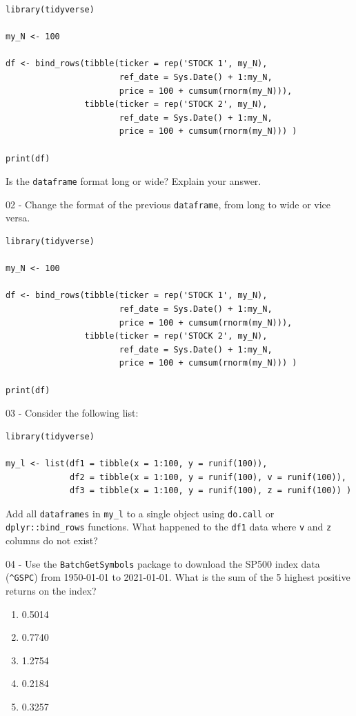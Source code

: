 \documentclass[
  12pt,
]{book}
\providecommand{\tightlist}{%
  \setlength{\itemsep}{0pt}\setlength{\parskip}{0pt}}
\begin{document}
\begin{verbatim}
library(tidyverse)

my_N <- 100

df <- bind_rows(tibble(ticker = rep('STOCK 1', my_N),
                       ref_date = Sys.Date() + 1:my_N,
                       price = 100 + cumsum(rnorm(my_N))),
                tibble(ticker = rep('STOCK 2', my_N),
                       ref_date = Sys.Date() + 1:my_N,
                       price = 100 + cumsum(rnorm(my_N))) )

print(df)
\end{verbatim}

Is the \texttt{dataframe} format long or wide? Explain your answer.

02 -
Change the format of the previous \texttt{dataframe}, from long to wide or vice versa.

\begin{verbatim}
library(tidyverse)

my_N <- 100

df <- bind_rows(tibble(ticker = rep('STOCK 1', my_N),
                       ref_date = Sys.Date() + 1:my_N,
                       price = 100 + cumsum(rnorm(my_N))),
                tibble(ticker = rep('STOCK 2', my_N),
                       ref_date = Sys.Date() + 1:my_N,
                       price = 100 + cumsum(rnorm(my_N))) )

print(df)
\end{verbatim}

03 -
Consider the following list:

\begin{verbatim}
library(tidyverse)

my_l <- list(df1 = tibble(x = 1:100, y = runif(100)),
             df2 = tibble(x = 1:100, y = runif(100), v = runif(100)),
             df3 = tibble(x = 1:100, y = runif(100), z = runif(100)) )
\end{verbatim}

Add all \texttt{dataframes} in \texttt{my\_l} to a single object using \texttt{do.call} or \texttt{dplyr::bind\_rows} functions. What happened to the \texttt{df1} data where \texttt{v} and \texttt{z} columns do not exist?

04 -
Use the \texttt{BatchGetSymbols} package to download the SP500 index data (\texttt{\textquotesingle{}\^{}GSPC\textquotesingle{}}) from 1950-01-01 to 2021-01-01. What is the sum of the 5 highest positive returns on the index?

\begin{enumerate}
\def\labelenumi{\alph{enumi})}
\tightlist
\item
  0.5014
\item
  0.7740
\item
  1.2754
\item
  0.2184
\item
  0.3257
\end{enumerate}
\end{document}
